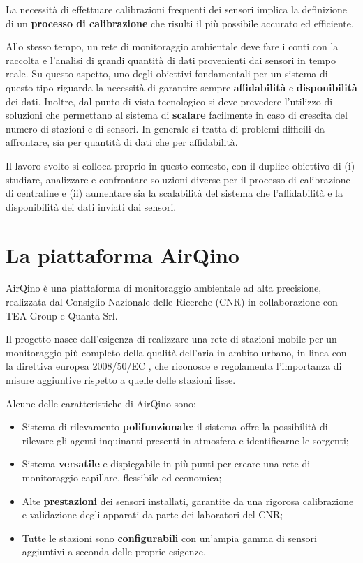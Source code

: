 La necessità di effettuare calibrazioni frequenti dei sensori implica la definizione di un \textbf{processo di calibrazione} che risulti il più possibile accurato ed efficiente.

Allo stesso tempo, un rete di monitoraggio ambientale deve fare i conti con la raccolta e l'analisi di grandi quantità di dati provenienti dai sensori in tempo reale. Su questo aspetto, uno degli obiettivi fondamentali per un sistema di questo tipo riguarda la necessità di garantire sempre \textbf{affidabilità} e \textbf{disponibilità} dei dati. Inoltre, dal punto di vista tecnologico si deve prevedere l'utilizzo di soluzioni che permettano al sistema di \textbf{scalare} facilmente in caso di crescita del numero di stazioni e di sensori. In generale si tratta di problemi difficili da affrontare, sia per quantità di dati che per affidabilità.

Il lavoro svolto si colloca proprio in questo contesto, con il duplice obiettivo di (i) studiare, analizzare e confrontare soluzioni diverse per il processo di calibrazione di centraline e (ii) aumentare sia la scalabilità del sistema che l'affidabilità e la disponibilità dei dati inviati dai sensori.

\section{La piattaforma AirQino}\label{sec:airqino}
AirQino è una piattaforma di monitoraggio ambientale ad alta precisione, realizzata dal Consiglio Nazionale delle Ricerche (CNR) in collaborazione con TEA Group e Quanta Srl. \cite{GUALTIERI2017609}

Il progetto nasce dall’esigenza di realizzare una rete di stazioni mobile per un monitoraggio più completo della qualità dell’aria in ambito urbano, in linea con la direttiva europea 2008/50/EC \cite{direttiva}, che riconosce e regolamenta l’importanza di misure aggiuntive rispetto a quelle delle stazioni fisse.

Alcune delle caratteristiche di AirQino sono:
\begin{itemize}
  \item Sistema di rilevamento \textbf{polifunzionale}: il sistema offre la possibilità di rilevare gli agenti inquinanti presenti in atmosfera e identificarne le sorgenti;
  \item Sistema \textbf{versatile} e dispiegabile in più punti per creare una rete di monitoraggio capillare, flessibile ed economica;
  \item Alte \textbf{prestazioni} dei sensori installati, garantite da una rigorosa calibrazione e validazione degli apparati da parte dei laboratori del CNR;
  \item Tutte le stazioni sono \textbf{configurabili} con un’ampia gamma di sensori aggiuntivi a seconda delle proprie esigenze. \cite{airqino}
\end{itemize}

